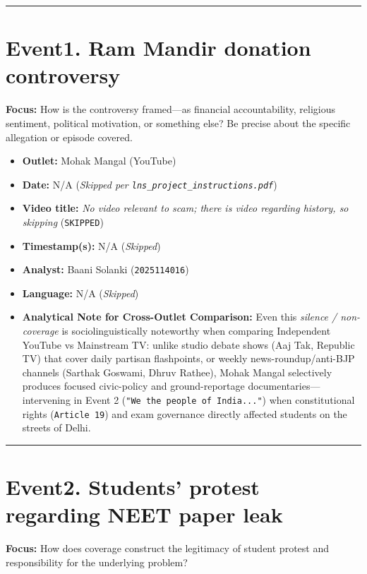 \documentclass[10pt,a4paper]{article}
\begin{document}
\vspace{4pt}\noindent\rule{\textwidth}{0.4pt}\vspace{4pt}

\section*{Event1. Ram Mandir donation controversy}
\textbf{Focus:} How is the controversy framed---as financial accountability, religious sentiment, political motivation, or something else? Be precise about the specific allegation or episode covered.

\begin{itemize}[leftmargin=1.5em, itemsep=3pt, topsep=4pt]
  \item \textbf{Outlet:} Mohak Mangal (YouTube)
  \item \textbf{Date:} N/A (\textit{Skipped per \texttt{lns\_project\_instructions.pdf}})
  \item \textbf{Video title:} \textit{No video relevant to scam; there is video regarding history, so skipping} (\texttt{SKIPPED})
  \item \textbf{Timestamp(s):} N/A (\textit{Skipped})
  \item \textbf{Analyst:} Baani Solanki (\texttt{2025114016})
  \item \textbf{Language:} N/A (\textit{Skipped})
  \item \textbf{Analytical Note for Cross-Outlet Comparison:} Even this \textit{silence / non-coverage} is sociolinguistically noteworthy when comparing Independent YouTube vs Mainstream TV: unlike studio debate shows (Aaj Tak, Republic TV) that cover daily partisan flashpoints, or weekly news-roundup/anti-BJP channels (Sarthak Goswami, Dhruv Rathee), Mohak Mangal selectively produces focused civic-policy and ground-reportage documentaries---intervening in Event 2 (\texttt{"We the people of India..."}) when constitutional rights (\texttt{Article 19}) and exam governance directly affected students on the streets of Delhi.
\end{itemize}
\vspace{4pt}\noindent\rule{\textwidth}{0.4pt}\vspace{4pt}

\section*{Event2. Students' protest regarding NEET paper leak}
\textbf{Focus:} How does coverage construct the legitimacy of student protest and responsibility for the underlying problem?
\end{document}
